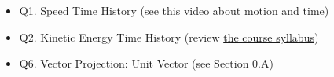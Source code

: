 \documentclass[11pt,letterpaper]{article}\usepackage[]{graphicx}\usepackage[]{color}
\begin{document}
\begin{itemize}\item Q1. Speed Time History (see \href{https://www.youtube.com/watch?v=lZPtFDXYQRU}{this video about motion and time})
\item Q2. Kinetic Energy Time History (review \href{https://www.purdue.edu/freeform/dynamics/wp-content/uploads/sites/4/2018/01/Syllabus-Spring-2018.pdf}{the course syllabus})
\item Q6. Vector Projection: Unit Vector (see Section 0.A)
\end{itemize}

\pagebreak
\end{document}
